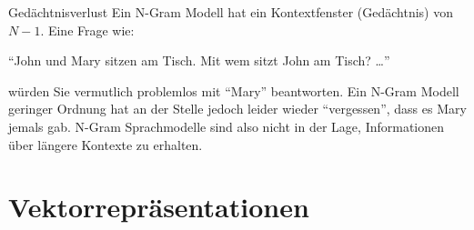\documentclass[aspectratio=169,10pt]{beamer}
\begin{document}
\begin{frame}[c]{Gedächtnisverlust}
    Ein N-Gram Modell hat ein Kontextfenster (Gedächtnis) von $N-1$. Eine Frage wie:

    \smallskip \enquote{John und Mary sitzen am Tisch. Mit wem sitzt John am Tisch? \dots}

    \smallskip würden Sie vermutlich problemlos mit \enquote{Mary} beantworten. Ein N-Gram Modell geringer Ordnung hat an der Stelle jedoch leider wieder \enquote{vergessen}, dass es Mary jemals gab. N-Gram Sprachmodelle sind also nicht in der Lage, Informationen über längere Kontexte zu erhalten.
\end{frame}

\section{Vektorrepräsentationen}
\end{document}
